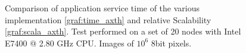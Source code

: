 \begin{figure}[p]
\centering
{}
\caption{ Comparison of application service time of the various implementation \ref{graf:time_axth} and relative Scalability \ref{graf:scala_axth}. Test performed on a set of 20 nodes with Intel E7400 @ 2.80 GHz CPU. Images of $10^6$ 8bit pixels.}
\label{chart:axt}
\end{figure}

